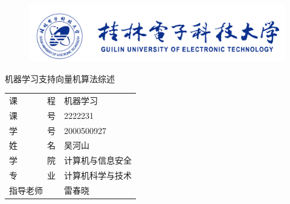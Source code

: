
\begin{titlepage}
	\begin{center}
		\begin{figure}[!ht]\vspace{-1em}
			\centering
 			\includegraphics{figures/桂电标志.png}
			\vspace{3em}\\

		\end{figure}
		
		\vspace{1.5em}
		
		\vspace{5em}
		\begin{center} {\erhao\hei 机器学习支持向量机算法综述}\end{center}
		
		\vspace{1em}
		{\sanhao
			\begin{center} \renewcommand{\arraystretch}{1.7}
				\begin{tabular}{l@{：}l}
					
					课~~~~~~~程 & 机器学习\\
					课~~~~~~~号 & 2222231\\
					学~~~~~~~号 & 2000500927 \\
					姓~~~~~~~名 & 吴河山 \\
                    学~~~~~~~院 & 计算机与信息安全\\
                    专~~~~~~~业 & 计算机科学与技术\\
					  指导老师  &  雷春晓\\
					

\end{tabular}
\end{center}}
\end{center}
\end{titlepage}
